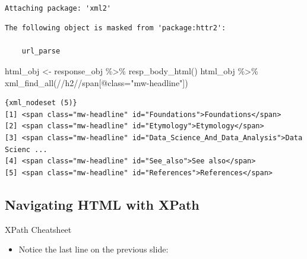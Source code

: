 \documentclass[
  letterpaper,
  DIV=11,
  numbers=noendperiod,
  oneside]{scrreprt}
\newenvironment{Shaded}{\begin{snugshade}}{\end{snugshade}}
\newcommand{\FunctionTok}[1]{\textcolor[rgb]{0.28,0.35,0.67}{#1}}
\newcommand{\NormalTok}[1]{\textcolor[rgb]{0.00,0.23,0.31}{#1}}
\newcommand{\OtherTok}[1]{\textcolor[rgb]{0.00,0.23,0.31}{#1}}
\newcommand{\SpecialCharTok}[1]{\textcolor[rgb]{0.37,0.37,0.37}{#1}}
\newcommand{\StringTok}[1]{\textcolor[rgb]{0.13,0.47,0.30}{#1}}
\providecommand{\tightlist}{%
  \setlength{\itemsep}{0pt}\setlength{\parskip}{0pt}}\usepackage{longtable,booktabs,array}
\begin{document}
\begin{verbatim}

Attaching package: 'xml2'
\end{verbatim}

\begin{verbatim}
The following object is masked from 'package:httr2':

    url_parse
\end{verbatim}

\begin{Shaded}
\begin{Highlighting}[]
\NormalTok{html\_obj }\OtherTok{\textless{}{-}}\NormalTok{ response\_obj }\SpecialCharTok{\%\textgreater{}\%} \FunctionTok{resp\_body\_html}\NormalTok{()}
\NormalTok{html\_obj }\SpecialCharTok{\%\textgreater{}\%} \FunctionTok{xml\_find\_all}\NormalTok{(}\StringTok{\textquotesingle{}//h2//span[@class="mw{-}headline"]\textquotesingle{}}\NormalTok{)}
\end{Highlighting}
\end{Shaded}

\begin{verbatim}
{xml_nodeset (5)}
[1] <span class="mw-headline" id="Foundations">Foundations</span>
[2] <span class="mw-headline" id="Etymology">Etymology</span>
[3] <span class="mw-headline" id="Data_Science_And_Data_Analysis">Data Scienc ...
[4] <span class="mw-headline" id="See_also">See also</span>
[5] <span class="mw-headline" id="References">References</span>
\end{verbatim}


\hypertarget{navigating-html-with-xpath}{%
\subsection{Navigating HTML with
XPath}\label{navigating-html-with-xpath}}

XPath Cheatsheet

\begin{itemize}
\tightlist
\item
  Notice the last line on the previous slide:
\end{itemize}
\end{document}
